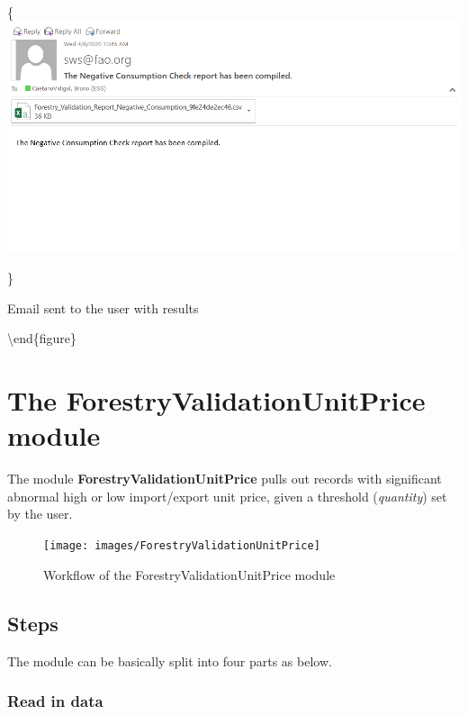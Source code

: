 \documentclass[
]{book}
\begin{document}
\{\centering \includegraphics[width=0.8\linewidth]{images/negative_consump_email_sent}

\}

\caption{Email sent to the user with results}

\label{fig:NegConsumpPluginEmail}
\textbackslash end\{figure\}

\hypertarget{ForestryValidationUnitPrice}{%
\chapter{\texorpdfstring{\textbf{The ForestryValidationUnitPrice module}}{The ForestryValidationUnitPrice module}}\label{ForestryValidationUnitPrice}}

The module \textbf{ForestryValidationUnitPrice} pulls out records with significant abnormal high or low import/export unit price, given a threshold (\emph{quantity}) set by the user.

\begin{figure}

{\centering \texttt{[image: images/ForestryValidationUnitPrice]} 

}

\caption{Workflow of the ForestryValidationUnitPrice module}\label{fig:ForestryValidationUnitPriceWorkflow}
\end{figure}

\hypertarget{steps-6}{%
\section{\texorpdfstring{\textbf{Steps}}{Steps}}\label{steps-6}}

The module can be basically split into four parts as below.

\hypertarget{read-in-data-2}{%
\subsection{Read in data}\label{read-in-data-2}}
\end{document}
